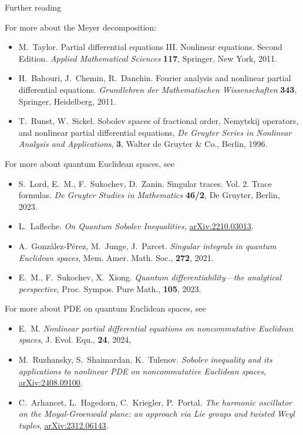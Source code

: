 \documentclass{beamer}
\numberwithin{equation}{section}
\theoremstyle{plain}
\theoremstyle{plain}
\theoremstyle{definition}
\theoremstyle{plain}
\theoremstyle{plain}
\theoremstyle{definition}
\begin{document}
\begin{frame}
\end{frame}


\begin{frame}{Further reading}
\tiny{
    For more about the Meyer decomposition:
    \begin{itemize}
        \item{} M.~Taylor. Partial differential equations III. Nonlinear equations. Second Edition. \textit{Applied Mathematical Sciences} \textbf{117}, Springer, New York, 2011.
        \item{} H.~Bahouri, J.~Chemin, R.~Danchin. Fourier analysis and nonlinear partial differential equations. \textit{Grundlehren der Mathematischen Wissenschaften} \textbf{343}, Springer, Heidelberg, 2011.
        \item{} T.~Runst, W.~Sickel. {Sobolev spaces of fractional order, {N}emytskij operators, and nonlinear partial differential equations}, \textit{De Gruyter Series in Nonlinear Analysis and Applications}, \textbf{3}, {Walter de Gruyter \& Co., Berlin}, {1996}.
    \end{itemize}
    For more about quantum Euclidean spaces, see
    \begin{itemize}
        \item{} S.~Lord, E.~M., F.~Sukochev, D.~Zanin. {Singular traces. {V}ol. 2. {T}race formulas}. \textit{De Gruyter Studies in Mathematics} \textbf{46/2}, De Gruyter, Berlin, 2023.
        \item{} L.~Lafleche. \textit{{On {Q}uantum {S}obolev {I}nequalities},} {\color{red}\href{https://arxiv.org/abs/2210.03013}{arXiv:2210.03013}}.
        \item{} A.~Gonz\'{a}lez-P\'{e}rez, M.~Junge, J.~Parcet. \textit{Singular integrals in quantum {E}uclidean spaces}, {Mem. Amer. Math. Soc.}, \textbf{272}, {2021}.
        \item{} E.~M., F.~Sukochev, X.~Xiong. \textit{Quantum differentiability---the analytical perspective}, {Proc. Sympos. Pure Math.}, \textbf{105}, 2023.
    \end{itemize}
    For more about PDE on quantum Euclidean spaces, see
    \begin{itemize}
        \item{} E.~M. \textit{Nonlinear partial differential equations on noncommutative {E}uclidean spaces}, {J. Evol. Equ.}, \textbf{24}, {2024},
        \item{} M.~Ruzhansky, S.~Shaimardan, K.~Tulenov. \textit{Sobolev inequality and its applications to nonlinear PDE on noncommutative Euclidean spaces}, {\color{red}\href{https://arxiv.org/abs/2408.09100}{arXiv:2408.09100}}.
        \item{} C.~Arhancet, L.~Hagedorn, C.~Kriegler, P.~Portal. \textit{The harmonic oscillator on the Moyal-Groenwald plane: an approach via Lie groups and twisted Weyl tuples}, {\color{red}\href{https://arxiv.org/abs/2312.06143}{arXiv:2312.06143}}.
    \end{itemize}
}
\end{frame}
\end{document}
